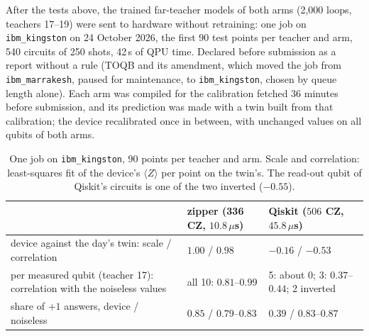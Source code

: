 \documentclass[11pt]{article}
\begin{document}
After the tests above, the trained far-teacher models of both arms (2{,}000 loops, teachers 17--19) were sent to
hardware without retraining: one job on \texttt{ibm\_kingston} on 24 October 2026, the first 90 test points per
teacher and arm, 540 circuits of 250 shots, 42\,s of QPU time. Declared before submission as a report without a rule
(TOQB  and its amendment, which moved the job from
\texttt{ibm\_marrakesh}, paused for maintenance, to \texttt{ibm\_kingston}, chosen by queue length alone). Each arm was
compiled for the calibration fetched 36 minutes before submission, and its prediction was made with a twin built
from that calibration; the device recalibrated once in between, with unchanged values on all qubits of both arms.

\begin{table}[h]
\centering
\small
\begin{tabular}{p{5.6cm}p{3.6cm}p{4.6cm}}
\toprule
 & zipper (336 CZ, $10.8\,\mu$s) & Qiskit ($506$ CZ, $45.8\,\mu$s) \\
\midrule
device against the day's twin: scale / correlation & $1.00$ / $0.98$ & $-0.16$ / $-0.53$ \\
per measured qubit (teacher 17): correlation with the noiseless values & all 10: $0.81$--$0.99$ & 5: about 0; 3: $0.37$--$0.44$; 2 inverted \\
share of $+1$ answers, device / noiseless & $0.85$ / $0.79$--$0.83$ & $0.39$ / $0.83$--$0.87$ \\
\bottomrule
\end{tabular}
\caption{One job on \texttt{ibm\_kingston}, 90 points per teacher and arm. Scale and correlation: least-squares fit of
the device's $\langle Z\rangle$ per point on the twin's. The read-out qubit of Qiskit's circuits is one of the two
inverted ($-0.55$).}
\label{tab:kingston}
\end{table}
\end{document}

